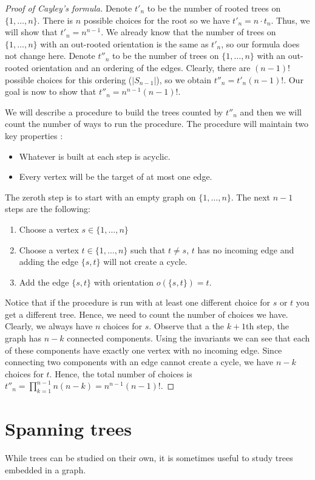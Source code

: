 \documentclass{tufte-handout}
\theoremstyle{definition}
\theoremstyle{remark}
\begin{document}
\begin{proof}[Proof of Cayley's formula]
	Denote $t'_n$ to be the number of rooted trees on $\{1,\dots, n\}$. There is $n$ possible choices for the root so we have $t'_n = n\cdot t_n$. Thus, we will show that $t'_n = n^{n-1}$. We already know that the number of trees on $\{1, \dots, n\}$ with an out-rooted orientation is the same as $t'_n$, so our formula does not change here. Denote $t''_n$ to be the number of trees on $\{1,\dots, n\}$ with an out-rooted orientation and an ordering of the edges. Clearly, there are $(n-1)!$ possible choices for this ordering ($|S_{n-1}|$), so we obtain $t''_n = t'_n(n-1)!$. Our goal is now to show that $t''_n = n^{n-1}(n-1)!$.
	
	We will describe a procedure to build the trees counted by $t''_n$ and then we will count the number of ways to run the procedure. The procedure will maintain two key properties : 
	\begin{itemize}
		\item Whatever is built at each step is acyclic.
		\item Every vertex will be the target of at most one edge.
	\end{itemize}
	The zeroth step is to start with an empty graph on $\{1,\dots, n\}$. The next $n-1$ steps are the following:
	\begin{enumerate}
		\item Choose a vertex $s \in \{1,\dots, n\}$
		\item Choose a vertex $t \in \{1,\dots, n\}$ such that $t \neq s$, $t$ has no incoming edge and adding the edge $\{s,t\}$ will not create a cycle.
		\item Add the edge $\{s,t\}$ with orientation $o(\{s,t\}) = t$.
	\end{enumerate}
	Notice that if the procedure is run with at least one different choice for $s$ or $t$ you get a different tree. Hence, we need to count the number of choices we have. Clearly, we always have $n$ choices for $s$. Observe that a the $k+1$th step, the graph has $n-k$ connected components. Using the invariants we can see that each of these components have exactly one vertex with no incoming edge. Since connecting two components with an edge cannot create a cycle, we have $n-k$ choices for $t$. Hence, the total number of choices is $t''_n = \prod_{k=1}^{n-1}n(n-k) = n^{n-1}(n-1)!$.
\end{proof}

\section{Spanning trees}
While trees can be studied on their own, it is sometimes useful to study trees embedded in a graph.
\end{document}
